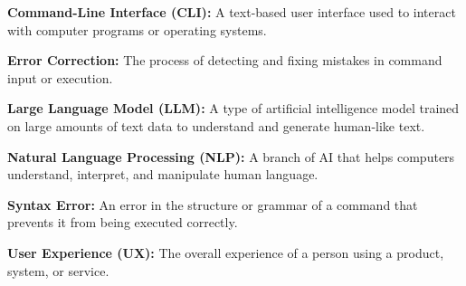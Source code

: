 \textbf{Command-Line Interface (CLI):} A text-based user interface used to interact with computer programs or operating systems.

\textbf{Error Correction:} The process of detecting and fixing mistakes in command input or execution.

\textbf{Large Language Model (LLM):} A type of artificial intelligence model trained on large amounts of text data to understand and generate human-like text.

\textbf{Natural Language Processing (NLP):} A branch of AI that helps computers understand, interpret, and manipulate human language.

\textbf{Syntax Error:} An error in the structure or grammar of a command that prevents it from being executed correctly.

\textbf{User Experience (UX):} The overall experience of a person using a product, system, or service.
